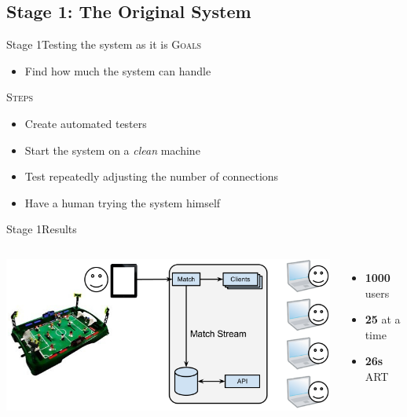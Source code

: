 \documentclass[utf8]{beamer}
\begin{document}
\subsection{Stage 1: The Original System}
\begin{frame}{Stage 1}{Testing the system as it is}
	\textsc{Goals}
	\begin{itemize}
		\item Find how much the system can handle
	\end{itemize}
	\pause
	\textsc{Steps}
	\begin{itemize}
		\item Create automated testers
		\item Start the system on a \emph{clean} machine
		\item Test repeatedly adjusting the number of connections
		\item Have a human trying the system himself
	\end{itemize}
\end{frame}
\begin{frame}{Stage 1}{Results}
	\begin{columns}
			\includegraphics[top=-1,width=\textwidth]{img/results-1.png}
			\begin{itemize}
				\item \textbf{\Large 1000} users
				\item \textbf{\Large 25} at a time
				\item \textbf{\Large 26s} ART
			\end{itemize}
	\end{columns}
\end{frame}
\end{document}
